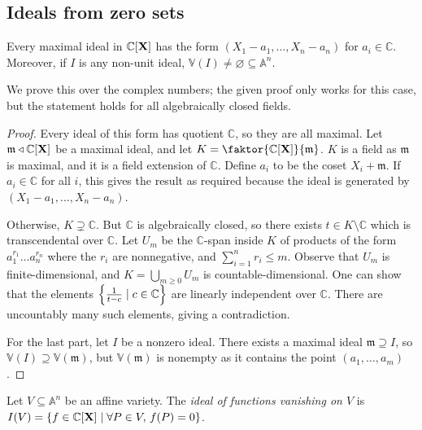\subsection{Ideals from zero sets}
\begin{theorem}
    Every maximal ideal in \( \mathbb C[\vb X] \) has the form \( (X_1 - a_1, \dots, X_n - a_n) \) for \( a_i \in \mathbb C \).
    Moreover, if \( I \) is any non-unit ideal, \( \mathbb V(I) \neq \varnothing \subseteq \mathbb A^n \).
\end{theorem}
We prove this over the complex numbers; the given proof only works for this case, but the statement holds for all algebraically closed fields.
\begin{proof}
    Every ideal of this form has quotient \( \mathbb C \), so they are all maximal.
    Let \( \mathfrak m \triangleleft \mathbb C[\vb X] \) be a maximal ideal, and let \( K = \faktor{\mathbb C[\vb X]}{\mathfrak m} \).
    \( K \) is a field as \( \mathfrak m \) is maximal, and it is a field extension of \( \mathbb C \).
    Define \( a_i \) to be the coset \( X_i + \mathfrak m \).
    If \( a_i \in \mathbb C \) for all \( i \), this gives the result as required because the ideal is generated by \( (X_1 - a_1, \dots, X_n - a_n) \).

    Otherwise, \( K \supsetneq \mathbb C \).
    But \( \mathbb C \) is algebraically closed, so there exists \( t \in K \setminus \mathbb C \) which is transcendental over \( \mathbb C \).
    Let \( U_m \) be the \( \mathbb C \)-span inside \( K \) of products of the form \( a_1^{r_1} \dots a_n^{r_n} \) where the \( r_i \) are nonnegative, and \( \sum_{i=1}^n r_i \leq m \).
    Observe that \( U_m \) is finite-dimensional, and \( K = \bigcup_{m \geq 0} U_m \) is countable-dimensional.
    One can show that the elements \( \qty{\frac{1}{t - c} \mid c \in \mathbb C} \) are linearly independent over \( \mathbb C \).
    There are uncountably many such elements, giving a contradiction.

    For the last part, let \( I \) be a nonzero ideal.
    There exists a maximal ideal \( \mathfrak m \supseteq I \), so \( \mathbb V(I) \supseteq \mathbb V(\mathfrak m) \), but \( \mathbb V(\mathfrak m) \) is nonempty as it contains the point \( (a_1, \dots, a_m) \).
\end{proof}
\begin{definition}
    Let \( V \subseteq \mathbb A^n \) be an affine variety.
    The \emph{ideal of functions vanishing on \( V \)} is \( I(V) = \qty{f \in \mathbb C[\vb X] \mid \forall P \in V,\, f(P) = 0} \).
\end{definition}
